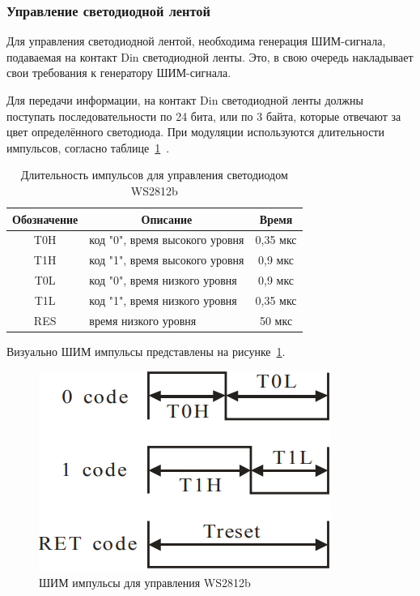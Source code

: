 \subsubsection{Управление светодиодной лентой}

Для управления светодиодной лентой, необходима генерация ШИМ-сиг\-нала, подаваемая на контакт Din светодиодной ленты. Это, в свою очередь накладывает свои требования к генератору ШИМ-сигнала.

Для передачи информации, на контакт Din светодиодной ленты должны поступать последовательности по 24 бита, или по 3 байта, которые отвечают за цвет определённого светодиода. При модуляции используются длительности импульсов, согласно таблице~\ref{tab:ws2812__data_transfer_time}~\cite{Worldseim}.

\begin{table}[H]
  \caption{Длительность импульсов для управления светодиодом WS2812b}
  \label{tab:ws2812__data_transfer_time}
  \begin{tabular}{|c|l|c|}
  \hline
  \textbf{Обозначение} & \multicolumn{1}{c|}{\textbf{Описание}} & \textbf{Время} \\ \hline
  T0H                  & код "0", время высокого уровня         & 0,35 мкс       \\ \hline
  T1H                  & код "1", время высокого уровня         & 0,9 мкс        \\ \hline
  T0L                  & код "0", время низкого уровня          & 0,9 мкс        \\ \hline
  T1L                  & код "1", время низкого уровня          & 0,35 мкс       \\ \hline
  RES                  & время низкого уровня                   & 50 мкс         \\ \hline
  \end{tabular}
\end{table}

Визуально ШИМ импульсы представлены на рисунке~\ref{img:WS2812__PWM_codes}.

\begin{figure}[H]
  \centering
  \includegraphics[height=0.2\textheight]{assets/images/practical/PWM__codes.png}
  \caption{ШИМ импульсы для управления WS2812b}
  \label{img:WS2812__PWM_codes}
\end{figure}

